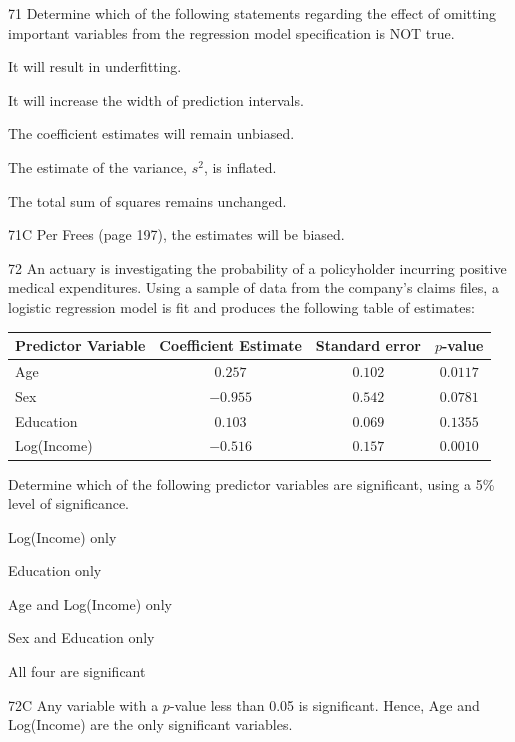 \begin{question}{71}
Determine which of the following statements regarding the effect of omitting important variables from the regression model specification is NOT true.

\begin{choices}
\item It will result in underfitting.
\item It will increase the width of prediction intervals.
\item The coefficient estimates will remain unbiased.
\item The estimate of the variance, $s^2$, is inflated.
\item The total sum of squares remains unchanged.
\end{choices}
\end{question}
\begin{solution}{71}{C}
Per Frees (page 197), the estimates will be biased.
\end{solution}

\begin{question}{72}
An actuary is investigating the probability of a policyholder incurring positive medical expenditures. Using a sample of data from the company's claims files, a logistic regression model is fit and produces the following table of estimates:
\begin{center}
\begin{tabular}{|l|c|c|c|}
\hline
Predictor Variable & Coefficient Estimate & Standard error & $p$-value \\ \hline
Age & $0.257$ & $0.102$ & $0.0117$ \\ \hline
Sex & $-0.955$ & $0.542$ & $0.0781$ \\ \hline
Education & $0.103$ & $0.069$ & $0.1355$ \\ \hline
Log(Income) & $-0.516$ & $0.157$ & $0.0010$ \\ \hline
\end{tabular}
\end{center}

Determine which of the following predictor variables are significant, using a 5\% level of significance.

\begin{choices}
\item Log(Income) only
\item Education only
\item Age and Log(Income) only
\item Sex and Education only
\item All four are significant
\end{choices}
\end{question}
\begin{solution}{72}{C}
Any variable with a $p$-value less than 0.05 is significant. Hence, Age and Log(Income) are the only significant variables.
\end{solution}

